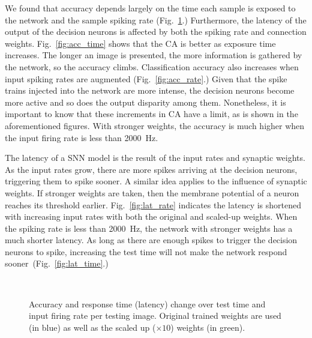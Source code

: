 We found that accuracy depends largely on the time each sample is exposed to the network and the sample spiking rate (Fig.~\ref{fig:assess}.)
Furthermore, the latency of the output of the decision neurons is affected by both the spiking rate and connection weights.
Fig.~\ref{fig:acc_time} shows that the CA is better as exposure time increases. The longer an image is presented, the more information is gathered by the network, so the accuracy climbs.
Classification accuracy also increases when input spiking rates are augmented (Fig.~\ref{fig:acc_rate}.) Given that the spike trains injected into the network are more intense, the decision neurons become more active and so does the output disparity among them.
Nonetheless, it is important to know that these increments in CA have a limit, as is shown in the aforementioned figures.
With stronger weights, the accuracy is much higher when the input firing rate is less than 2000~Hz.


The latency of a SNN model is the result of the input rates and synaptic weights.
As the input rates grow, there are more spikes arriving at the decision neurons, triggering them to spike sooner.
A similar idea applies to the influence of synaptic weights. If stronger weights are taken, then the membrane potential of a neuron reaches its threshold earlier.
Fig.~\ref{fig:lat_rate} indicates the latency is shortened with increasing input rates with both the original and scaled-up weights.
When the spiking rate is less than 2000~Hz, the network with stronger weights has a much shorter latency.
As long as there are enough spikes to trigger the decision neurons to spike, increasing the test time will not make the network respond sooner~(Fig.~\ref{fig:lat_time}.)
	\begin{figure}[htb!]
	  \centering
	  	  \\
	  \caption{Accuracy and response time (latency) change over test time and input firing rate per testing image. Original trained weights are used (in blue) as well as the scaled up ($\times10$) weights (in green). }
	  \label{fig:assess}
	\end{figure}

